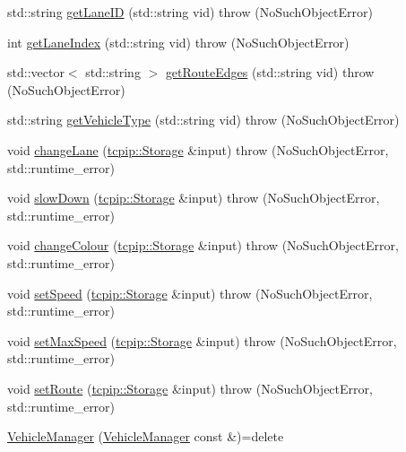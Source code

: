 \begin{DoxyCompactItemize}
\item 
std\+::string \hyperlink{classtraci__api_1_1_vehicle_manager_a5cf2db6460fa94ccb2b3d489369b7d0e}{get\+Lane\+ID} (std\+::string vid)  throw (\+No\+Such\+Object\+Error)
\item 
int \hyperlink{classtraci__api_1_1_vehicle_manager_a8daaf314dfb440dfb48575b072cd0d41}{get\+Lane\+Index} (std\+::string vid)  throw (\+No\+Such\+Object\+Error)
\item 
std\+::vector$<$ std\+::string $>$ \hyperlink{classtraci__api_1_1_vehicle_manager_a399053f44944093adf9a00536bf86bba}{get\+Route\+Edges} (std\+::string vid)  throw (\+No\+Such\+Object\+Error)
\item 
std\+::string \hyperlink{classtraci__api_1_1_vehicle_manager_a946553555fa7a2a9f95b4baced6f0dbe}{get\+Vehicle\+Type} (std\+::string vid)  throw (\+No\+Such\+Object\+Error)
\item 
void \hyperlink{classtraci__api_1_1_vehicle_manager_a5441f5ea01a06473f831ac85b9a6c70f}{change\+Lane} (\hyperlink{classtcpip_1_1_storage}{tcpip\+::\+Storage} \&input)  throw (\+No\+Such\+Object\+Error, std\+::runtime\+\_\+error)
\item 
void \hyperlink{classtraci__api_1_1_vehicle_manager_afaa8625978e32aab7ca85cd52ce450a8}{slow\+Down} (\hyperlink{classtcpip_1_1_storage}{tcpip\+::\+Storage} \&input)  throw (\+No\+Such\+Object\+Error, std\+::runtime\+\_\+error)
\item 
void \hyperlink{classtraci__api_1_1_vehicle_manager_a6829e259033dcd95611755953f164ef0}{change\+Colour} (\hyperlink{classtcpip_1_1_storage}{tcpip\+::\+Storage} \&input)  throw (\+No\+Such\+Object\+Error, std\+::runtime\+\_\+error)
\item 
void \hyperlink{classtraci__api_1_1_vehicle_manager_a40adaaa7aaaae5708855c6c4715204fe}{set\+Speed} (\hyperlink{classtcpip_1_1_storage}{tcpip\+::\+Storage} \&input)  throw (\+No\+Such\+Object\+Error, std\+::runtime\+\_\+error)
\item 
void \hyperlink{classtraci__api_1_1_vehicle_manager_a5bd46032db2b057eb7e5a5c61d043827}{set\+Max\+Speed} (\hyperlink{classtcpip_1_1_storage}{tcpip\+::\+Storage} \&input)  throw (\+No\+Such\+Object\+Error, std\+::runtime\+\_\+error)
\item 
void \hyperlink{classtraci__api_1_1_vehicle_manager_a30063f71f02a6272244d7d1e1e9ec99d}{set\+Route} (\hyperlink{classtcpip_1_1_storage}{tcpip\+::\+Storage} \&input)  throw (\+No\+Such\+Object\+Error, std\+::runtime\+\_\+error)
\item 
\hyperlink{classtraci__api_1_1_vehicle_manager_a7e9e05b65776f0709f0b84a51c44377f}{Vehicle\+Manager} (\hyperlink{classtraci__api_1_1_vehicle_manager}{Vehicle\+Manager} const \&)=delete

\end{DoxyCompactItemize}
